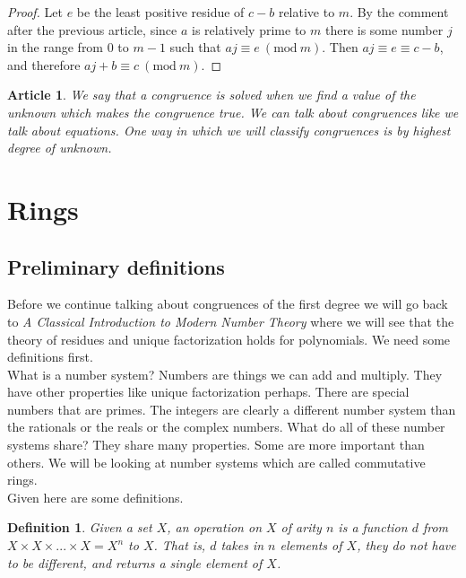 \documentclass{article}
\theoremstyle{problemstyle}
\newtheorem{article}{Article}
\newtheorem{definition}{Definition}
\newcommand{\Mod}[1]{\ (\mathrm{mod}\ #1)}
\begin{document}
\begin{proof}
Let $e$ be the least positive residue of $c-b$ relative to $m$. By the comment after the previous article, since $a$ is relatively prime to $m$ there is some number $j$ in the range from $0$ to $m-1$ such that $aj \equiv e \Mod{m}$. Then $aj \equiv e \equiv c-b$, and therefore $aj + b \equiv c \Mod{m}$. 
\end{proof}

\begin{article}
We say that a congruence is solved when we find a value of the unknown which makes the congruence true. We can talk about congruences like we talk about equations. One way in which we will classify congruences is by highest degree of unknown. 
\end{article}

\section*{Rings}

\subsection*{Preliminary definitions}

Before we continue talking about congruences of the first degree we will go back to \textit{A Classical Introduction to Modern Number Theory} where we will see that the theory of residues and unique factorization holds for polynomials. We need some definitions first.\\

What is a number system? Numbers are things we can add and multiply. They have other properties like unique factorization perhaps. There are special numbers that are primes. The integers are clearly a different number system than the rationals or the reals or the complex numbers. What do all of these number systems share? They share many properties. Some are more important than others. We will be looking at number systems which are called commutative rings.\\

Given here are some definitions. 

\setcounter{definition}{0}

\begin{definition}
Given a set $X$, an operation on $X$ of arity $n$ is a function $d$ from $X\times X \times ... \times X = X^n$ to $X$. That is, $d$ takes in $n$ elements of $X$, they do not have to be different, and returns a single element of $X$.  
\end{definition}
\end{document}

